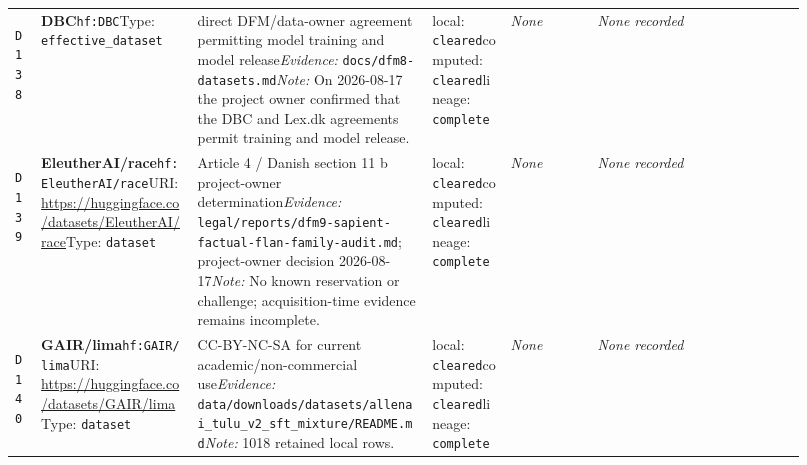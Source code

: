 \documentclass[9pt,a4paper]{article}
\newcommand{\depid}[1]{\hypertarget{dep:#1}{\texttt{#1}}}
\begin{document}
\begin{landscape}
\begin{longtable}{@{}L{0.035\linewidth}L{0.185\linewidth}L{0.27\linewidth}L{0.09\linewidth}L{0.10\linewidth}L{0.24\linewidth}@{}}
\depid{D138} & \textbf{DBC}\newline \nolinkurl{hf:DBC}\newline Type: \texttt{effective\_dataset} & direct DFM/data-owner agreement permitting model training and model release\newline \textit{Evidence:} \nolinkurl{docs/dfm8-datasets.md}\newline \textit{Note:} On 2026-08-17 the project owner confirmed that the DBC and Lex.dk agreements permit training and model release. & local: \texttt{cleared}\newline computed: \texttt{cleared}\newline lineage: \texttt{complete} & \textit{None} & \textit{None recorded} \\
\depid{D139} & \textbf{EleutherAI/race}\newline \nolinkurl{hf:EleutherAI/race}\newline URI: \url{https://huggingface.co/datasets/EleutherAI/race}\newline Type: \texttt{dataset} & Article 4 / Danish section 11 b project-owner determination\newline \textit{Evidence:} \nolinkurl{legal/reports/dfm9-sapient-factual-flan-family-audit.md}; project-owner decision 2026-08-17\newline \textit{Note:} No known reservation or challenge; acquisition-time evidence remains incomplete. & local: \texttt{cleared}\newline computed: \texttt{cleared}\newline lineage: \texttt{complete} & \textit{None} & \textit{None recorded} \\
\depid{D140} & \textbf{GAIR/lima}\newline \nolinkurl{hf:GAIR/lima}\newline URI: \url{https://huggingface.co/datasets/GAIR/lima}\newline Type: \texttt{dataset} & CC-BY-NC-SA for current academic/non-commercial use\newline \textit{Evidence:} \nolinkurl{data/downloads/datasets/allenai_tulu_v2_sft_mixture/README.md}\newline \textit{Note:} 1018 retained local rows. & local: \texttt{cleared}\newline computed: \texttt{cleared}\newline lineage: \texttt{complete} & \textit{None} & \textit{None recorded} \\

\end{longtable}
\end{landscape}
\end{document}
